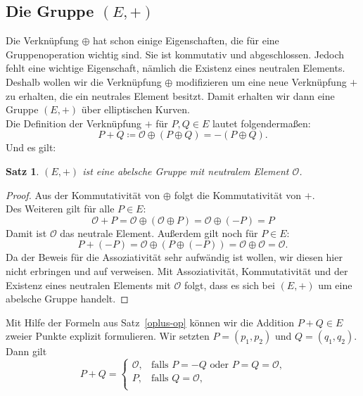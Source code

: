 \documentclass[hidelinks]{article}
\theoremstyle{plain}
\newtheorem{thm}{Satz}[section]
\theoremstyle{definition}
\theoremstyle{rem}
\newcommand{\patinf}{\mathcal{O}}
\begin{document}
\begin{sloppypar}
\subsection{Die Gruppe $(E, +)$}
Die Verknüpfung $\oplus$ hat schon einige Eigenschaften, die für eine Gruppenoperation wichtig sind.
Sie ist kommutativ und abgeschlossen. Jedoch fehlt eine wichtige Eigenschaft, nämlich die Existenz eines neutralen Elements.
Deshalb wollen wir die Verknüpfung $\oplus$ modifizieren um eine neue Verknüpfung $+$ zu erhalten, die ein neutrales Element besitzt. 
Damit erhalten wir dann eine Gruppe $(E, +)$ über elliptischen Kurven. \\
Die Definition der Verknüpfung $+$ für $P, Q \in E$ lautet folgendermaßen:
\begin{equation} \label{plus-op}
    P + Q \coloneqq \patinf \oplus (P \oplus Q) = -(P \oplus Q).
\end{equation}
Und es gilt:
\begin{thm}
    $(E, +)$ ist eine abelsche Gruppe mit neutralem Element $\patinf$.
\end{thm}
\begin{proof}
    Aus der Kommutativität von $\oplus$ folgt die Kommutativität von $+$. \\
    Des Weiteren gilt für alle $P \in E$:
    \begin{equation*}
        \patinf + P = \patinf \oplus (\patinf \oplus P) = \patinf \oplus (-P) = P
    \end{equation*}
    Damit ist $\patinf$ das neutrale Element. Außerdem gilt noch für $P \in E$:
    \begin{equation*}
        P + (-P) = \patinf \oplus (P \oplus (-P)) = \patinf \oplus \patinf = \patinf.
    \end{equation*}
    Da der Beweis für die Assoziativität sehr aufwändig ist wollen, wir diesen hier nicht erbringen und auf \cite{knapp} verweisen.
    Mit Assoziativität, Kommutativität und der Existenz eines neutralen Elements mit $\patinf$ folgt, dass es sich bei $(E, +)$ um eine abelsche Gruppe handelt.
\end{proof}
Mit Hilfe der Formeln aus Satz~\ref{oplus-op} können wir die Addition $P + Q \in E$ zweier Punkte explizit formulieren.
Wir setzten $P = (p_1, p_2)$ und $Q = (q_1, q_2)$. Dann gilt 
\begin{equation*}
    P + Q = \begin{cases}
        \patinf, & \text{falls $P=-Q$ oder $P=Q=\patinf$,} \\
        P, & \text{falls $Q=\patinf$,} \\

\end{cases}
\end{equation*}
\end{sloppypar}
\end{document}
